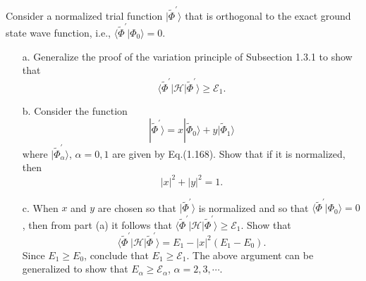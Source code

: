 \documentclass[a4paper]{book}
\newcounter{exercise}[chapter]
\begin{document}
	\begin{exercise}
	Consider a normalized trial function $|\tilde{\Phi}^\prime \rangle$ that is orthogonal to the exact ground state wave function, i.e., $\langle \tilde{\Phi}^\prime | \Phi_0 \rangle = 0$.
	\begin{enumerate}
	
	\item[a.] Generalize the proof of the variation principle of Subsection 1.3.1 to show that
	\[
		\langle \tilde{\Phi}^\prime | \mathscr{H} | \tilde{\Phi}^\prime \rangle \geq \mathscr{E}_1.
	\]	

	\item[b.] Consider the function
	\[
		| \tilde{\Phi}^\prime \rangle = x | \tilde{\Phi}_0 \rangle + y | \tilde{\Phi}_1 \rangle
	\]
	where $| \tilde{\Phi}^\prime_\alpha \rangle$, $\alpha = 0, 1$ are given by Eq.(1.168). Show that if it is normalized, then
	\[
		|x|^2 + |y|^2 = 1.
	\]
	
	\item[c.] When $x$ and $y$ are chosen so that $| \tilde{\Phi}^\prime \rangle$ is normalized and so that $\langle \tilde{\Phi}^\prime | \Phi_0 \rangle = 0$, then from part (a) it follows that $\langle \tilde{\Phi}^\prime | \mathscr{H} | \tilde{\Phi}^\prime \rangle \geq \mathscr{E}_1$. Show that
	\[
		\langle \tilde{\Phi}^\prime | \mathscr{H} | \tilde{\Phi}^\prime \rangle = E_1 - |x|^2 ( E_1 - E_0 ).
	\]
	Since $E_1 \geq E_0$, conclude that $E_1 \geq \mathscr{E}_1$. The above argument can be generalized to show that $E_\alpha \geq \mathscr{E}_\alpha$, $\alpha=2,3,\cdots$.
	
	\end{enumerate}
	\end{exercise}
	
\end{document}
